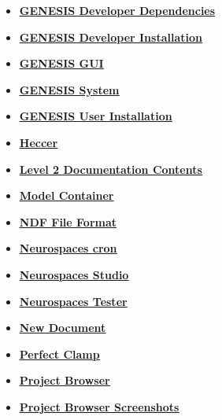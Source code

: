 \documentclass[12pt]{article}
\begin{document}
\begin{itemize}
\item \href{../genesis-dependencies/genesis-dependencies.pdf}{\bf \underline{GENESIS Developer Dependencies}}

\item \href{../installation-developer/installation-developer.pdf}{\bf \underline{GENESIS Developer Installation}}

\item \href{../gui/gui.pdf}{\bf \underline{GENESIS GUI}}

\item \href{../genesis-system/genesis-system.pdf}{\bf \underline{GENESIS System}}

\item \href{../installation-user/installation-user.pdf}{\bf \underline{GENESIS User Installation}}

\item \href{../heccer/heccer.pdf}{\bf \underline{Heccer}}

\item \href{../contents-level2/contents-level2.pdf}{\bf \underline{Level 2 Documentation Contents}}

\item \href{../model-container/model-container.pdf}{\bf \underline{Model Container}}

\item \href{../ndf-file-format/ndf-file-format.pdf}{\bf \underline{NDF File Format}}

\item \href{../neurospaces-cron/neurospaces-cron.pdf}{\bf \underline{Neurospaces cron}}

\item \href{../studio/studio.pdf}{\bf \underline{Neurospaces Studio}}

\item \href{../neurospaces-tester/neurospaces-tester.pdf}{\bf \underline{Neurospaces Tester}}

\item \href{../NewDocument/NewDocument.pdf}{\bf \underline{New Document}}

\item \href{../pclamp/pclamp.pdf}{\bf \underline{Perfect Clamp}}

\item \href{../project-browser/project-browser.pdf}{\bf \underline{Project Browser}}

\item \href{../project-browser-screenshots/project-browser-screenshots.pdf}{\bf \underline{Project Browser Screenshots}}


\end{itemize}
\end{document}
